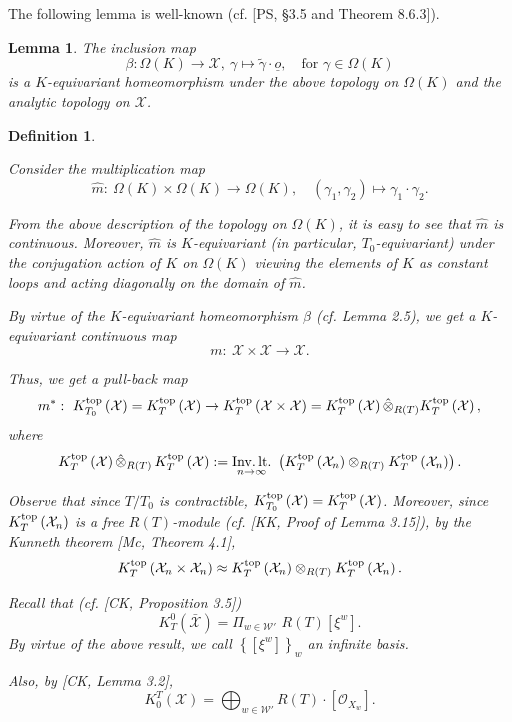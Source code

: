 \documentclass{article}
\newtheorem{definition}[theorem]{Definition}
\newtheorem{lemma}[theorem]{Lemma}
\def\X{\mathcal{X}}
\def\W{\mathcal{W}}
\def\cite#1{#1}
\def\ref#1{#1}
\def\Inv.lt.{\rm{Inv.\, lt.}}
\def\top{\rm{top}}
\begin{document}
The following lemma is well-known (cf. [\cite{PS}, \S3.5 and Theorem 8.6.3]). 

\begin{lemma} \label{2.5}
The inclusion map 
$$ 
\beta: \Omega (K) \rightarrow \X,~ \gamma \mapsto \tilde{\gamma}\cdot \underline{o},\quad \mbox{for } \gamma\in \Omega (K)
$$
is a $K$-equivariant homeomorphism  under the above topology on $\Omega (K)$ and the analytic topology on $\X$.  

\end{lemma}

\begin{definition} \label{2.6}\rm{
Consider the multiplication map 
$$
\hat{m}:~\Omega (K) \times \Omega (K) \rightarrow \Omega (K), \quad \left( \gamma_1,  \gamma_2\right) \mapsto \gamma_1\cdot \gamma_2.
$$

From the above description of the topology on $\Omega(K)$, it is easy to see that $\hat{m}$ is continuous. Moreover, $\hat{m}$ is $K$-equivariant (in particular, $T_0$-equivariant) under the conjugation action of $K$ on $\Omega(K)$ viewing the elements of $K$ as constant loops and acting diagonally on the domain of $\hat{m}$. 

By virtue of the $K$-equivariant homeomorphism $\beta$ (cf. Lemma \ref{2.5}), we get a $K$-equivariant {\it continuous} map 
$$
m:~\X\times \X \rightarrow \X.
$$

Thus, we get a pull-back map
$$
m^*:~K^{\top}_{T_0}\left(\X\right) = K^{\top}_T \left(\X\right) \rightarrow K^{\top}_T \left(\X\times \X\right) = K_T^{\top} \left(\X\right) {\hat{\otimes}}_{R(T)} K_T^{\top} \left(\X\right),
$$
where 
$$
K_T^{\top}\left(\X\right)  {\hat{\otimes}}_{R(T)}\, K_T^{\top} \left(\X\right) := \underset{n\rightarrow \infty}{\Inv.lt.} \,\,\left(K_T^{\top}\left(\X_n\right)\otimes_{R(T)}K_T^{\top} \left(\X_n\right)\right). 
$$

Observe that since $T/T_0$ is contractible, $K_{T_0}^{\top}\left(\X\right)=K_T^{\top}\left(\X\right)$. Moreover,  since $K_T^{\top}\left(\X_n\right)$ is a free $R(T)$-module (cf. [\cite{KK}, Proof of Lemma 3.15]), by the Kunneth theorem [\cite{Mc}, Theorem 4.1], 
$$
K_T^{\top}\left(\X_n\times \X_n\right) \approx K_T^{\top}\left(\X_n\right) \otimes_{R(T)} K_T^{\top}\left(\X_n\right).
$$ 

Recall that (cf. [\cite{CK}, Proposition 3.5])
\begin{equation}\label{eq2.6.1}
K_T^{0}\left(\bar{\X}\right)= \Pi_{w\in \W'} \,\,R(T)\left[\xi^w\right].
\end{equation}
By virtue of the above result,  we call $\left\{ \left[\xi^w\right]\right\}_w$ an {\it infinite} basis.

 Also, by [\cite{CK}, Lemma 3.2],
\begin{equation}\label{eq2.6.2}
K_0^T\left(\X\right) = \bigoplus_{ w\in \W'} R(T)\cdot \left[\mathcal{O}_{X_w}\right].
\end{equation}}
\end{definition}
\end{document}
